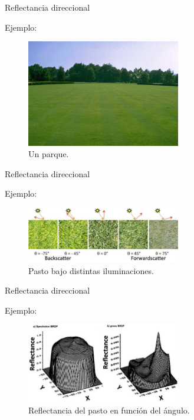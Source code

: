 \documentclass[handout]{beamer}
\begin{document}
\begin{frame}{Reflectancia direccional}
  \begin{exampleblock}{Ejemplo:}
    \begin{figure}
      \includegraphics[width=0.6\textwidth]{imagenes/grass.png}
      \caption{Un parque.}
    \end{figure}
  \end{exampleblock}
\end{frame}

\begin{frame}{Reflectancia direccional}
  \begin{exampleblock}{Ejemplo:}
    \begin{figure}
      \includegraphics[width=0.6\textwidth]{imagenes/grass2.png}
      \caption{Pasto bajo distintas iluminaciones.}
    \end{figure}
  \end{exampleblock}
\end{frame}

\begin{frame}{Reflectancia direccional}
  \begin{exampleblock}{Ejemplo:}
    \begin{figure}
      \includegraphics[width=0.6\textwidth]{imagenes/grass_brdf.png}
      \caption{Reflectancia del pasto en función del ángulo.}
    \end{figure}
  \end{exampleblock}
\end{frame}
\end{document}
